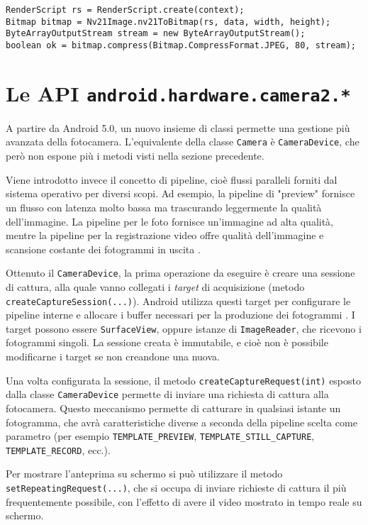 \begin{verbatim}
RenderScript rs = RenderScript.create(context);
Bitmap bitmap = Nv21Image.nv21ToBitmap(rs, data, width, height);
ByteArrayOutputStream stream = new ByteArrayOutputStream();
boolean ok = bitmap.compress(Bitmap.CompressFormat.JPEG, 80, stream);
\end{verbatim}


\section{Le API \texttt{android.hardware.camera2.*}}
\label{sec:hdmi_camera2}

A partire da Android 5.0, un nuovo insieme di classi permette una gestione più avanzata della fotocamera. L'equivalente della classe \texttt{Camera} è \texttt{CameraDevice}, che però non espone più i metodi visti nella sezione precedente.

Viene introdotto invece il concetto di pipeline, cioè flussi paralleli forniti dal sistema operativo per diversi scopi. Ad esempio, la pipeline di "preview" fornisce un flusso con latenza molto bassa ma trascurando leggermente la qualità dell'immagine. La pipeline per le foto fornisce un'immagine ad alta qualità, mentre la pipeline per la registrazione video offre qualità dell'immagine e scansione costante dei fotogrammi in uscita \cite{googleio}.

Ottenuto il \texttt{CameraDevice}, la prima operazione da eseguire è creare una sessione di cattura, alla quale vanno collegati i \emph{target} di acquisizione (metodo \texttt{createCaptureSession(...)}). Android utilizza questi target per configurare le pipeline interne e allocare i buffer necessari per la produzione dei fotogrammi \cite{camera2}. I target possono essere \texttt{SurfaceView}, oppure istanze di \texttt{ImageReader}, che ricevono i fotogrammi singoli. La sessione creata è immutabile, e cioè non è possibile modificarne i target se non creandone una nuova.

Una volta configurata la sessione, il metodo \texttt{createCaptureRequest(int)} esposto dalla classe \texttt{CameraDevice} permette di inviare una richiesta di cattura alla fotocamera. Questo meccanismo permette di catturare in qualsiasi istante un fotogramma, che avrà caratteristiche diverse a seconda della pipeline scelta come parametro (per esempio \texttt{TEMPLATE\_PREVIEW}, \texttt{TEMPLATE\_STILL\_CAPTURE}, \texttt{TEMPLATE\_RECORD}, ecc.).

Per mostrare l'anteprima su schermo si può utilizzare il metodo \texttt{setRepeatingRequest(...)}, che si occupa di inviare richieste di cattura il più frequentemente possibile, con l'effetto di avere il video mostrato in tempo reale su schermo.

